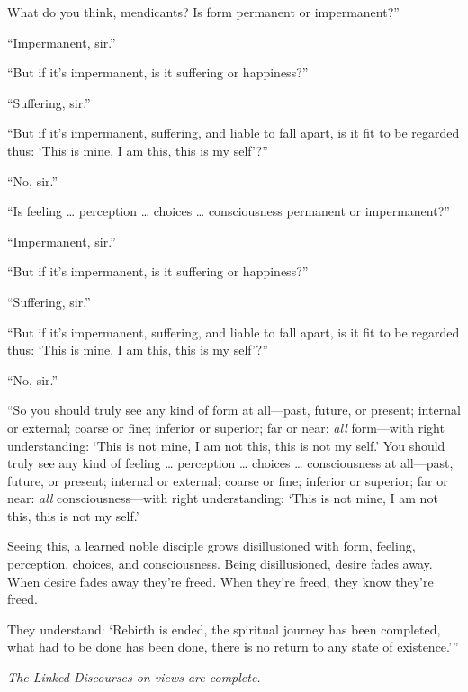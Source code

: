 \documentclass[12pt,openany]{book}%
\let\oldcontentsline\contentsline
\newcommand{\nopagecontentsline}[3]{\oldcontentsline{#1}{#2}{}}
\newcommand*{\scendsutta}[1]{\begin{center}\textit{#1}\end{center}}
\begin{document}
What do you think, mendicants? Is form permanent or impermanent?” 

“Impermanent, sir.” 

“But if it’s impermanent, is it suffering or happiness?” 

“Suffering, sir.” 

“But if it’s impermanent, suffering, and liable to fall apart, is it fit to be regarded thus: ‘This is mine, I am this, this is my self’?” 

“No, sir.” 

“Is feeling … perception … choices … consciousness permanent or impermanent?” 

“Impermanent, sir.” 

“But if it’s impermanent, is it suffering or happiness?” 

“Suffering, sir.” 

“But if it’s impermanent, suffering, and liable to fall apart, is it fit to be regarded thus: ‘This is mine, I am this, this is my self’?” 

“No, sir.” 

“So you should truly see any kind of form at all—past, future, or present; internal or external; coarse or fine; inferior or superior; far or near: \emph{all} form—with right understanding: ‘This is not mine, I am not this, this is not my self.’ You should truly see any kind of feeling … perception … choices … consciousness at all—past, future, or present; internal or external; coarse or fine; inferior or superior; far or near: \emph{all} consciousness—with right understanding: ‘This is not mine, I am not this, this is not my self.’ 

Seeing this, a learned noble disciple grows disillusioned with form, feeling, perception, choices, and consciousness. Being disillusioned, desire fades away. When desire fades away they’re freed. When they’re freed, they know they’re freed. 

They understand: ‘Rebirth is ended, the spiritual journey has been completed, what had to be done has been done, there is no return to any state of existence.’” 

\scendsutta{The Linked Discourses on views are complete. }

%
\end{document}
